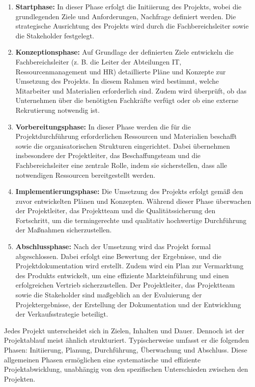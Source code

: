 \documentclass[a4paper, 12pt]{scrartcl}
\begin{document}
	\begin{enumerate}
		\item \textbf{Startphase:} 
		In dieser Phase erfolgt die Initiierung des Projekts, wobei die grundlegenden Ziele und Anforderungen, Nachfrage definiert werden. Die strategische Ausrichtung des Projekts wird durch die Fachbereichsleiter sowie die Stakeholder festgelegt.
		\item \textbf{Konzeptionsphase:}
		Auf Grundlage der definierten Ziele entwickeln die Fachbereichsleiter (z. B. die Leiter der Abteilungen IT, Ressourcenmanagement und HR) detaillierte Pläne und Konzepte zur Umsetzung des Projekts. In diesem Rahmen wird bestimmt, welche Mitarbeiter und Materialien erforderlich sind. Zudem wird überprüft, ob das Unternehmen über die benötigten Fachkräfte verfügt oder ob eine externe Rekrutierung notwendig ist.
		\item \textbf{Vorbereitungsphase:} 
		In dieser Phase werden die für die Projektdurchführung erforderlichen Ressourcen und Materialien beschafft sowie die organisatorischen Strukturen eingerichtet. Dabei übernehmen insbesondere der Projektleiter, das Beschaffungsteam und die Fachbereichsleiter eine zentrale Rolle, indem sie sicherstellen, dass alle notwendigen Ressourcen bereitgestellt werden.
		\item \textbf{Implementierungsphase:}  
		Die Umsetzung des Projekts erfolgt gemäß den zuvor entwickelten Plänen und Konzepten. Während dieser Phase überwachen der Projektleiter, das Projektteam und die Qualitätssicherung den Fortschritt, um die termingerechte und qualitativ hochwertige Durchführung der Maßnahmen sicherzustellen.
		\item \textbf{Abschlussphase:} 
		Nach der Umsetzung wird das Projekt formal abgeschlossen. Dabei erfolgt eine Bewertung der Ergebnisse, und die Projektdokumentation wird erstellt. Zudem wird ein Plan zur Vermarktung des Produkts entwickelt, um eine effiziente Markteinführung und einen erfolgreichen Vertrieb sicherzustellen. Der Projektleiter, das Projektteam sowie die Stakeholder sind maßgeblich an der Evaluierung der Projektergebnisse, der Erstellung der Dokumentation und der Entwicklung der Verkaufsstrategie beteiligt.
	\end{enumerate}
	Jedes Projekt unterscheidet sich in Zielen, Inhalten und Dauer. Dennoch ist der Projektablauf meist ähnlich strukturiert. Typischerweise umfasst er die folgenden Phasen: Initiierung, Planung, Durchführung, Überwachung und Abschluss. Diese allgemeinen Phasen ermöglichen eine systematische und effiziente Projektabwicklung, unabhängig von den spezifischen Unterschieden zwischen den Projekten\cite{wegmann2006projektmanagement}.
\end{document}
